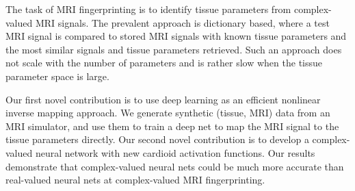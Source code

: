 The task of MRI fingerprinting is to identify tissue parameters from
complex-valued MRI signals.  The prevalent approach is
dictionary based, where a test MRI signal is compared to stored MRI
signals with known tissue parameters and the most similar
signals and tissue parameters retrieved.  Such an approach does
not scale with the number of parameters and is rather slow when the
tissue parameter space is large.  

Our first novel contribution is to use deep learning as an efficient
nonlinear inverse mapping approach.  We
generate synthetic (tissue, MRI) data from an MRI simulator, and use
them to train a deep net to map the MRI signal to the tissue
parameters directly.
%
Our second novel contribution is to develop a complex-valued neural network
with new cardioid activation functions.  Our results demonstrate 
that complex-valued neural nets could be much more accurate than real-valued
neural nets at complex-valued MRI fingerprinting.  